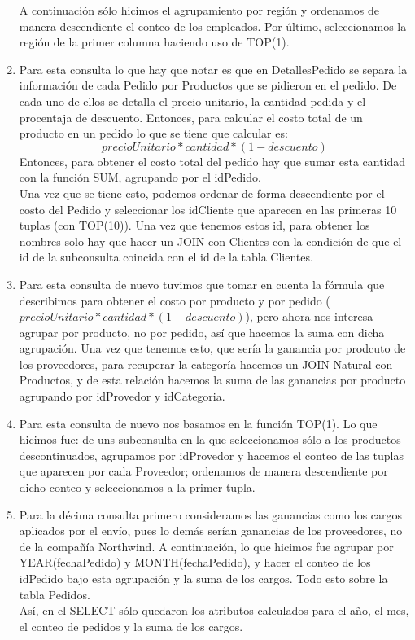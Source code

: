 \documentclass[11pt]{article}
\begin{document}
\begin{enumerate}[label=\arabic*.]
A continuación sólo hicimos el agrupamiento por región y ordenamos de manera descendiente el conteo de los empleados. Por último, seleccionamos la región de la primer columna haciendo uso de TOP(1).
\item Para esta consulta lo que hay que notar es que en DetallesPedido se separa la información de cada Pedido por Productos que se pidieron en el pedido. De cada uno de ellos se detalla el precio unitario, la cantidad pedida y el procentaja de descuento. Entonces, para calcular el costo total de un producto en un pedido lo que se tiene que calcular es: 
\begin{equation*}
precioUnitario*cantidad*(1-descuento)
\end{equation*}
Entonces, para obtener el costo total del pedido hay que sumar esta cantidad con la función SUM, agrupando por el idPedido.\\
Una vez que se tiene esto, podemos ordenar de forma descendiente por el costo del Pedido y seleccionar los idCliente que aparecen en las primeras 10 tuplas (con TOP(10)). Una vez que tenemos estos id, para obtener los nombres solo hay que hacer un JOIN con Clientes con la condición de que el id de la subconsulta coincida con el id de la tabla Clientes. 
\item Para esta consulta de nuevo tuvimos que tomar en cuenta la fórmula que describimos para obtener el costo por producto y por pedido ($precioUnitario*cantidad*(1-descuento)$), pero ahora nos interesa agrupar por producto, no por pedido, así que hacemos la suma con dicha agrupación. Una vez que tenemos esto, que sería la ganancia por prodcuto de los proveedores, para recuperar la categoría hacemos un JOIN Natural con Productos, y de esta relación hacemos la suma de las ganancias por producto agrupando por idProvedor y idCategoria.
\item Para esta consulta de nuevo nos basamos en la función TOP(1). Lo que hicimos fue: de uns subconsulta en la que seleccionamos sólo a los productos descontinuados, agrupamos por idProvedor y hacemos el conteo de las tuplas que aparecen por cada Proveedor; ordenamos de manera descendiente por dicho conteo y seleccionamos a la primer tupla.
\item Para la décima consulta primero consideramos las ganancias como los cargos aplicados por el envío, pues lo demás serían ganancias de los proveedores, no de la compañía Northwind. A continuación, lo que hicimos fue agrupar por YEAR(fechaPedido) y MONTH(fechaPedido), y hacer el conteo de los idPedido bajo esta agrupación y la suma de los cargos. Todo esto sobre la tabla Pedidos. \\
Así, en el SELECT sólo quedaron los atributos calculados para el año, el mes, el conteo de pedidos y la suma de los cargos. 
\end{enumerate}
\end{document}
